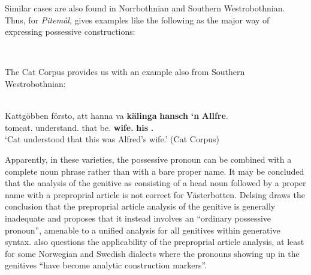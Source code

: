 \ea
{}
\z 
\z

Similar cases are also found in Norrbothnian and Southern Westrobothnian. Thus, for \textit{Pitemål}, \citet{Brännström1993} gives examples like the following as the major way of expressing possessive constructions:

\ea\label{}
\\

\z 
\z

The Cat Corpus provides us with an example also from Southern Westrobothnian:


\ea\label{}
\\
\gll Kattgöbben  försto, att  hanna  va  \textbf{kälinga} \textbf{hansch} \textbf{‘n} \textbf{Allfre}.\\
tomcat.{}  understand.{\pst} that  {\dem}  be.{\pst}  \textbf{wife.{}} \textbf{his} \textbf{{\pda}.{\m}} \\ 
\glt ‘Cat understood that this was Alfred’s wife.’ (Cat Corpus)
\z

Apparently, in these varieties, the possessive pronoun can be combined with a complete noun phrase rather than with a bare proper name. It may be concluded that the analysis of the genitive as consisting of a head noun followed by a proper name with a preproprial article is not correct for Västerbotten.  Delsing draws the conclusion that the preproprial article analysis of the genitive is generally inadequate and proposes that it instead involves an “ordinary possessive pronoun”, amenable to a unified analysis for all genitives within generative syntax. \citet{KoptjevskajaTamm2003} also questions the applicability of the preproprial article analysis, at least for some Norwegian and Swedish dialects where the pronouns showing up in the genitives “have become analytic construction markers”. 

